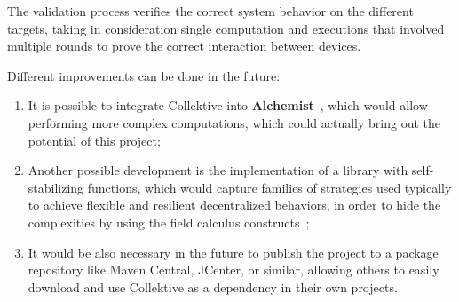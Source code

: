 The validation process verifies the correct system behavior on the different targets, taking in consideration single computation and executions that involved multiple rounds to prove the correct interaction between devices.

Different improvements can be done in the future:
\begin{enumerate}
    \item It is possible to integrate Collektive into \textbf{Alchemist}~\cite{alchemist}, which would allow performing more complex computations, which could actually bring out the potential of this project;
    \item Another possible development is the implementation of a library with self-stabilizing functions, which would capture families of strategies used typically to achieve flexible and resilient decentralized behaviors, in order to hide the complexities by using the field calculus constructs~\cite{self_stabilisation_functions};
    \item It would be also necessary in the future to publish the project to a package repository like Maven Central, JCenter, or similar, allowing others to easily download and use Collektive as a dependency in their own projects.
\end{enumerate}